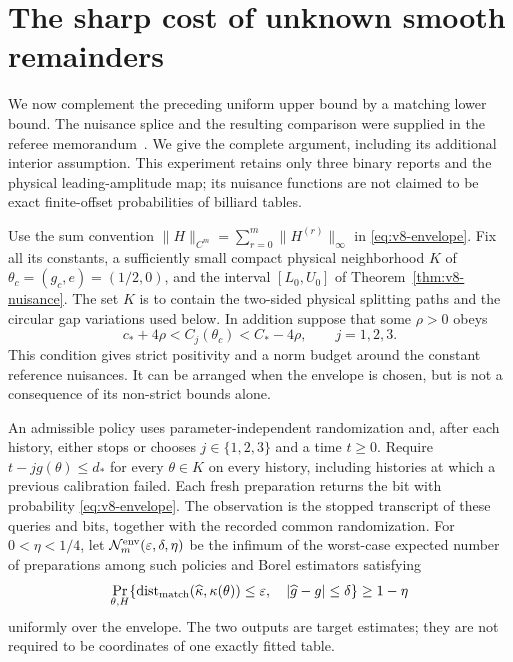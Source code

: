 \section{The sharp cost of unknown smooth remainders}
\label{sec:v9-envelope-minimax}
We now complement the preceding uniform upper bound by a matching
lower bound. The nuisance splice and the resulting comparison were
supplied in the referee memorandum~\cite{A2ReviewV8}. We give the
complete argument, including its additional interior assumption.
This experiment retains only three binary reports and the physical
leading-amplitude map; its nuisance functions are not claimed to be
exact finite-offset probabilities of billiard tables.

Use the sum convention
$\|H\|_{C^m}=\sum_{r=0}^m\|H^{(r)}\|_\infty$ in
\eqref{eq:v8-envelope}. Fix all its constants, a sufficiently small
compact physical neighborhood $K$ of
$\theta_c=(g_c,e)=(1/2,0)$, and the interval
$[L_0,U_0]$ of Theorem~\ref{thm:v8-nuisance}. The set $K$ is to
contain the two-sided physical splitting paths and the circular gap
variations used below. In addition suppose that some $\rho>0$ obeys
\begin{equation}\label{eq:v9-interior-slack}
       c_*+4\rho<C_j(\theta_c)<C_*-4\rho,
                                      \qquad j=1,2,3.
\end{equation}
This condition gives strict positivity and a norm budget around the
constant reference nuisances. It can be arranged when the envelope
is chosen, but is not a consequence of its non-strict bounds alone.

An admissible policy uses parameter-independent randomization and,
after each history, either stops or chooses $j\in\{1,2,3\}$ and
a time $t\ge0$. Require $t-jg(\theta)\le d_*$ for every
$\theta\in K$ on every history, including histories at which a
previous calibration failed. Each fresh preparation returns the bit
with probability \eqref{eq:v8-envelope}. The observation is the
stopped transcript of these queries and bits, together with the
recorded common randomization. For $0<\eta<1/4$, let
$\mathcal N_m^{\rm env}(\varepsilon,\delta,\eta)$ be the infimum
of the worst-case expected number of preparations among such policies
and Borel estimators satisfying
\begin{equation}\label{eq:v9-joint-loss}
 \Pr_{\theta,H}\{
 \operatorname{dist}_{\rm match}(\widehat\kappa,\kappa(\theta))
     \le\varepsilon,\quad |\widehat g-g|\le\delta\}\ge1-\eta
\end{equation}
uniformly over the envelope. The two outputs are target estimates;
they are not required to be coordinates of one exactly fitted table.

